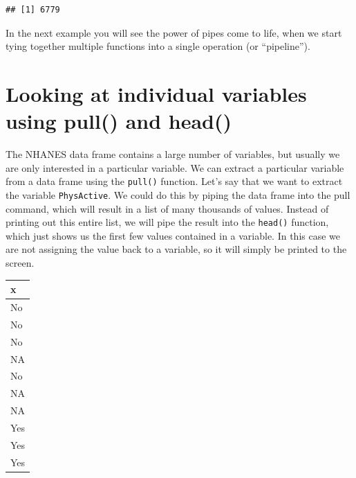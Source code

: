 \documentclass[12pt,]{book}
\newenvironment{Shaded}{\begin{snugshade}}{\end{snugshade}}
\newcommand{\CommentTok}[1]{\textcolor[rgb]{0.56,0.35,0.01}{\textit{#1}}}
\newcommand{\DecValTok}[1]{\textcolor[rgb]{0.00,0.00,0.81}{#1}}
\newcommand{\KeywordTok}[1]{\textcolor[rgb]{0.13,0.29,0.53}{\textbf{#1}}}
\newcommand{\NormalTok}[1]{#1}
\newcommand{\OperatorTok}[1]{\textcolor[rgb]{0.81,0.36,0.00}{\textbf{#1}}}
\newcommand{\StringTok}[1]{\textcolor[rgb]{0.31,0.60,0.02}{#1}}
\begin{document}
\begin{verbatim}
## [1] 6779
\end{verbatim}

In the next example you will see the power of pipes come to life, when we start tying together multiple functions into a single operation (or ``pipeline'').

\hypertarget{looking-at-individual-variables-using-pull-and-head}{%
\section{Looking at individual variables using pull() and head()}\label{looking-at-individual-variables-using-pull-and-head}}

The NHANES data frame contains a large number of variables, but usually we are only interested in a particular variable. We can extract a particular variable from a data frame using the \texttt{pull()} function. Let's say that we want to extract the variable \texttt{PhysActive}. We could do this by piping the data frame into the pull command, which will result in a list of many thousands of values. Instead of printing out this entire list, we will pipe the result into the \texttt{head()} function, which just shows us the first few values contained in a variable. In this case we are not assigning the value back to a variable, so it will simply be printed to the screen.

\begin{Shaded}
\end{Shaded}

\begin{tabular}{l}
\hline
x\\
\hline
No\\
\hline
No\\
\hline
No\\
\hline
NA\\
\hline
No\\
\hline
NA\\
\hline
NA\\
\hline
Yes\\
\hline
Yes\\
\hline
Yes\\
\hline
\end{tabular}
\end{document}
